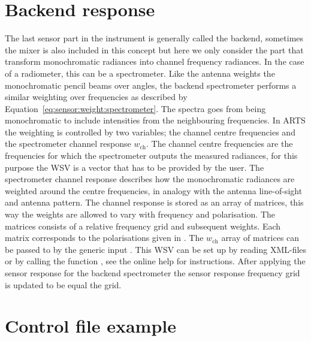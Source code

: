 \section{Backend response}
\label{sec:sensor:backend}
The last sensor part in the instrument is generally called the backend, sometimes the mixer is also included in this concept but here we only consider the part that transform monochromatic radiances into channel frequency radiances. In the case of a radiometer, this can be a spectrometer. Like the antenna weights the monochromatic pencil beams over angles, the backend spectrometer performs a similar weighting over frequencies as described by Equation~\ref{eq:sensor:weight:spectrometer}. The spectra goes from being monochromatic to include intensities from the neighbouring frequencies. 
In ARTS the weighting is controlled by two variables; the channel centre frequencies  and the spectrometer channel response $w_\mathrm{ch}$. The channel centre frequencies are the frequencies for which  the spectrometer outputs the measured radiances, for this purpose the WSV  is a vector that has to be provided by the user.
The spectrometer channel response describes how the monochromatic radiances are weighted around the centre frequencies, in analogy with the antenna line-of-sight and antenna pattern. The channel response is stored as an array of matrices, this way the weights are allowed to vary with frequency and polarisation. The matrices consists of a relative frequency grid and subsequent weights. Each matrix corresponds to the polarisations given in . The $w_\mathrm{ch}$ array of matrices can be passed to  by the generic input . This WSV can be set up by reading XML-files or by calling the function , see the online help for instructions.
After applying the sensor response for the backend spectrometer the sensor response frequency grid is updated to be equal the  grid.
% 
% 


\section{Control file example}


